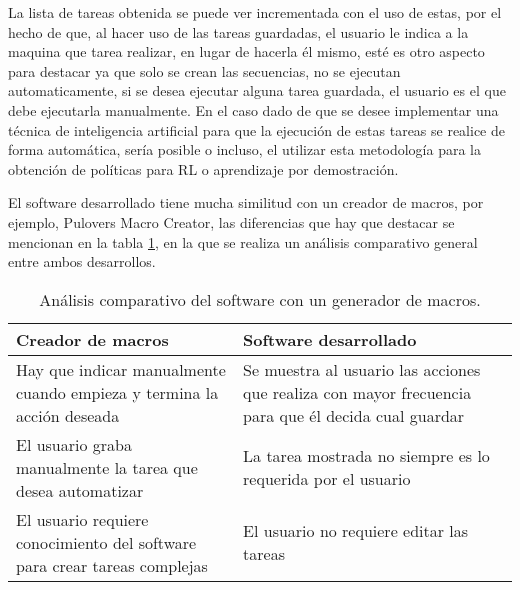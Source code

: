 La lista de tareas obtenida se puede ver incrementada con el uso de estas, por 
 el hecho de que, al hacer uso de las tareas guardadas, el usuario le indica a 
 la maquina que tarea realizar, en lugar de hacerla \'el mismo, est\'e es otro 
 aspecto para destacar ya que solo se crean las secuencias, no se ejecutan 
 automaticamente, si se desea ejecutar alguna tarea guardada, el usuario es el 
 que debe ejecutarla manualmente. En el caso dado de que se desee implementar 
 una t\'ecnica de inteligencia artificial para que la ejecuci\'on de estas 
 tareas se realice de forma autom\'atica, ser\'ia posible o incluso, el 
 utilizar esta metodolog\'ia para la obtenci\'on de pol\'iticas para RL o 
 aprendizaje por demostraci\'on.


El software desarrollado tiene mucha similitud con un creador de macros, por 
 ejemplo, Pulovers Macro Creator, las diferencias que hay que destacar se 
 mencionan en la tabla \ref{vsmacros}, en la que se realiza un an\'alisis 
 comparativo general entre ambos desarrollos.
 

\begin{table}[h]
\centering
\begin{tabular}{m{6cm}|m{6cm}}
\hline
Creador de macros 	&	Software desarrollado \\
\hline
Hay que indicar manualmente cuando empieza y termina la acci\'on deseada	
 &	
Se muestra al usuario las acciones que realiza con mayor frecuencia para que
  \'el decida cual guardar\\
\hline

El usuario graba manualmente la tarea que desea automatizar	
 &
La tarea mostrada no siempre es lo requerida por el usuario\\
\hline

El usuario requiere conocimiento del software para crear tareas complejas 	
 &
El usuario no requiere editar las tareas\\
\hline
\end{tabular}
\caption{An\'alisis comparativo del software con un generador de macros.}
\label{vsmacros}
\end{table}


